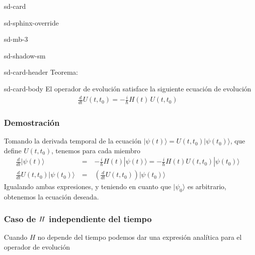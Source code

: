 \documentclass[letterpaper,10pt,english]{jupyterBook}
\newcommand{\ket}[1]{|#1\rangle}
\begin{document}
\begin{sphinxuseclass}{sd-card}
\begin{sphinxuseclass}{sd-sphinx-override}
\begin{sphinxuseclass}{sd-mb-3}
\begin{sphinxuseclass}{sd-shadow-sm}
\begin{sphinxuseclass}{sd-card-header}
\sphinxAtStartPar
Teorema:

\end{sphinxuseclass}
\begin{sphinxuseclass}{sd-card-body}
\sphinxAtStartPar
El operador de evolución satisface la siguiente ecuación de evolución
\begin{equation*}
\begin{split}
 \frac{d}{dt}U(t,t_0) = -\frac{i}{\hbar} H(t)\, U(t,t_0)
\end{split}
\end{equation*}\subsubsection*{Demostración}

\sphinxAtStartPar
Tomando la derivada temporal de la ecuación \(\ket{\psi(t)} = U(t,t_0)\ket{\psi(t_0)}\), que define \(U(t,t_0)\), tenemos para cada miembro
\label{equation:docs/Part_01_Formalismo/Chapter_02_01_Fundamentos_MC_myst:dc4e0f9b-34ea-4bc6-824e-b8c1b94dec69}\begin{eqnarray}
\frac{d}{dt}\ket{\psi(t)} &~=~& -\frac{i}{\hbar}  H(t)\ket{\psi(t)} = -\frac{i}{\hbar} H(t)U(t,t_0)\ket{\psi(t_0)}  \nonumber\\
\frac{d}{dt}U(t,t_0)\ket{\psi(t_0)} &~=~& \left(\frac{d}{dt}U(t,t_0)\right)\ket{\psi(t_0)}
\end{eqnarray}
\sphinxAtStartPar
Igualando ambas expresiones, y teniendo en cuanto que \(\ket{\psi_0}\) es arbitrario, obtenemos la ecuación deseada.

\end{sphinxuseclass}
\end{sphinxuseclass}
\end{sphinxuseclass}
\end{sphinxuseclass}
\end{sphinxuseclass}

\subsubsection{Caso de \protect\(H\protect\) independiente del tiempo}
\label{\detokenize{docs/Part_01_Formalismo/Chapter_02_01_Fundamentos_MC_myst:caso-de-h-independiente-del-tiempo}}
\sphinxAtStartPar
Cuando \(H\) no depende del tiempo podemos dar una expresión analítica para el operador de evolución
\end{document}

